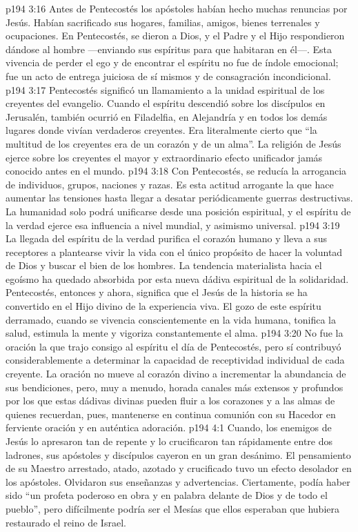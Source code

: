 \vs p194 3:16 \pc Antes de Pentecostés los apóstoles habían hecho muchas renuncias por Jesús. Habían sacrificado sus hogares, familias, amigos, bienes terrenales y ocupaciones. En Pentecostés, se dieron a Dios, y el Padre y el Hijo respondieron dándose al hombre ---enviando sus espíritus para que habitaran en él---. Esta vivencia de perder el ego y de encontrar el espíritu no fue de índole emocional; fue un acto de entrega juiciosa de sí mismos y de consagración incondicional.
\vs p194 3:17 Pentecostés significó un llamamiento a la unidad espiritual de los creyentes del evangelio. Cuando el espíritu descendió sobre los discípulos en Jerusalén, también ocurrió en Filadelfia, en Alejandría y en todos los demás lugares donde vivían verdaderos creyentes. Era literalmente cierto que “la multitud de los creyentes era de un corazón y de un alma”. La religión de Jesús ejerce sobre los creyentes el mayor y extraordinario efecto unificador jamás conocido antes en el mundo.
\vs p194 3:18 \pc Con Pentecostés, se reducía la arrogancia de individuos, grupos, naciones y razas. Es esta actitud arrogante la que hace aumentar las tensiones hasta llegar a desatar periódicamente guerras destructivas. La humanidad solo podrá unificarse desde una posición espiritual, y el espíritu de la verdad ejerce esa influencia a nivel mundial, y asimismo universal.
\vs p194 3:19 La llegada del espíritu de la verdad purifica el corazón humano y lleva a sus receptores a plantearse vivir la vida con el único propósito de hacer la voluntad de Dios y buscar el bien de los hombres. La tendencia materialista hacia el egoísmo ha quedado absorbida por esta nueva dádiva espiritual de la solidaridad. Pentecostés, entonces y ahora, significa que el Jesús de la historia se ha convertido en el Hijo divino de la experiencia viva. El gozo de este espíritu derramado, cuando se vivencia conscientemente en la vida humana, tonifica la salud, estimula la mente y vigoriza constantemente el alma.
\vs p194 3:20 \pc No fue la oración la que trajo consigo al espíritu el día de Pentecostés, pero sí contribuyó considerablemente a determinar la capacidad de receptividad individual de cada creyente. La oración no mueve al corazón divino a incrementar la abundancia de sus bendiciones, pero, muy a menudo, horada canales más extensos y profundos por los que estas dádivas divinas pueden fluir a los corazones y a las almas de quienes recuerdan, pues, mantenerse en continua comunión con su Hacedor en ferviente oración y en auténtica adoración.
\vs p194 4:1 Cuando, los enemigos de Jesús lo apresaron tan de repente y lo crucificaron tan rápidamente entre dos ladrones, sus apóstoles y discípulos cayeron en un gran desánimo. El pensamiento de su Maestro arrestado, atado, azotado y crucificado tuvo un efecto desolador en los apóstoles. Olvidaron sus enseñanzas y advertencias. Ciertamente, podía haber sido “un profeta poderoso en obra y en palabra delante de Dios y de todo el pueblo”, pero difícilmente podría ser el Mesías que ellos esperaban que hubiera restaurado el reino de Israel.
